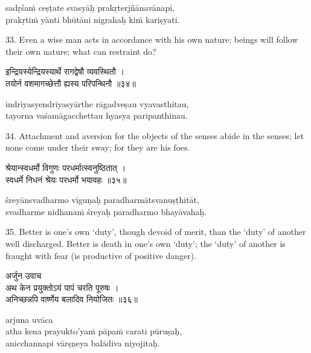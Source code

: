 \begin{transliteration}
sadṛśaṁ ceṣṭate svasyāḥ prakṛterjñānavānapi, \\
prakṛtiṁ yānti bhūtāni nigrahaḥ kiṁ kariṣyati.
\end{transliteration}

33. Even a wise man acts in accordance with his own nature; beings will follow
their own nature; what can restraint do?

\begin{gitaverse}
इन्द्रियस्येन्द्रियस्यार्थे रागद्वेषौ व्यवस्थितौ । \\
तयोर्न वशमागच्छेत्तौ ह्यस्य परिपन्थिनौ ॥३४॥
\end{gitaverse}

\begin{transliteration}
indriyasyendriyasyārthe rāgadveṣau vyavasthitau, \\
tayorna vaśamāgacchettau hyasya paripanthinau.
\end{transliteration}

34. Attachment and aversion for the objects of the senses abide in the senses;
let none come under their sway; for they are his foes.

\begin{gitaverse}
श्रेयान्स्वधर्मो विगुणः परधर्मात्स्वनुष्ठितात् । \\
स्वधर्मे निधनं श्रेयः परधर्मो भयावहः ॥३५॥
\end{gitaverse}

\begin{transliteration}
śreyānsvadharmo viguṇaḥ paradharmātsvanuṣṭhitāt, \\
svadharme nidhanaṁ śreyaḥ paradharmo bhayāvahaḥ.
\end{transliteration}

35. Better is one's own `duty', though devoid of merit, than the `duty' of
another well discharged. Better is death in one's own `duty'; the `duty' of
another is fraught with fear (is productive of positive danger).

\begin{gitaverse}
अर्जुन उवाच \\
अथ केन प्रयुक्तोऽयं पापं चरति पूरुषः । \\
अनिच्छन्नपि वार्ष्णेय बलादिव नियोजितः ॥३६॥
\end{gitaverse}

\begin{transliteration}
arjuna uvāca \\
atha kena prayukto'yaṁ pāpaṁ carati pūruṣaḥ, \\
anicchannapi vārṣṇeya balādiva niyojitaḥ.
\end{transliteration}

